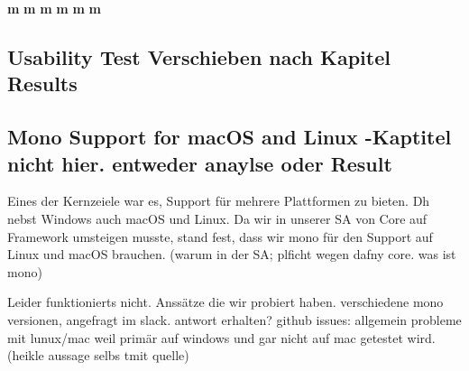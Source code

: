 \textbf{m}
\textbf{m}
\textbf{m}
\textbf{m}
\textbf{m}
\textbf{m}



\subsection{Usability Test Verschieben nach Kapitel Results}


\subsection{Mono Support for macOS and Linux -Kaptitel nicht hier. entweder anaylse oder Result}
Eines der Kernzeiele war es, Support für mehrere Plattformen zu bieten. Dh nebst Windows auch macOS und Linux.
Da wir in unserer SA von Core auf Framework umsteigen musste, stand fest, dass wir mono für den Support auf Linux und macOS brauchen.
(warum in der SA; plficht wegen dafny core. was ist mono)

Leider funktionierts nicht.
Anssätze die wir probiert haben. verschiedene mono versionen, angefragt im slack. antwort erhalten?
github issues: allgemein probleme mit lunux/mac weil primär auf windows und gar nicht auf mac getestet wird. (heikle aussage selbs tmit quelle)

\cite{sa}
\cite{mono-slack}
\cite{mono-git}

